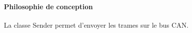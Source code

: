 \paragraph{Philosophie de conception}
La classe Sender permet d'envoyer les trames sur le bus CAN.\\